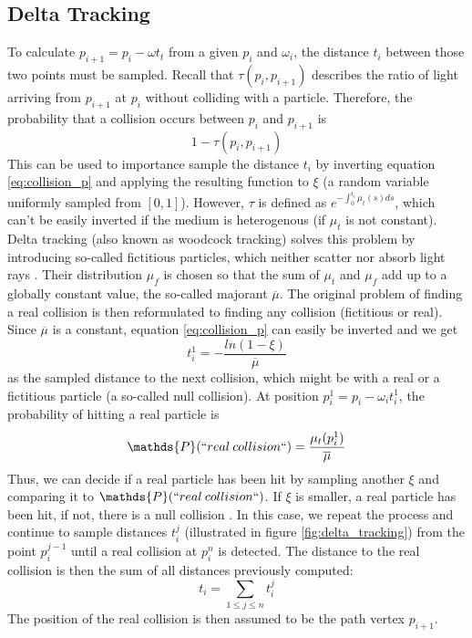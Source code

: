 \subsection{Delta Tracking}
To calculate $p_{i+1} = p_i - \omega t_t$ from a given $p_i$ and $\omega_i$, the distance $t_i$ between those two points must be sampled. Recall that $\tau(p_i, p_{i+1})$ describes the ratio of light arriving from $p_{i+1}$ at $p_i$ without colliding with a particle. Therefore, the probability that a collision occurs between $p_i$ and $p_{i+1}$ is 
\begin{equation} \label{eq:collision_p}
1 - \tau({p_i, p_{i+1}})
\end{equation}
This can be used to importance sample \cite{osti_4167844} the distance $t_i$ by inverting equation \ref{eq:collision_p} and applying the resulting function to $\xi$ (a random variable uniformly sampled from $[0,1]$). However, $\tau$ is defined as $e^{-\int_{0}^{t_i}\mu_t(s)ds}$, which can't be easily inverted if the medium is heterogenous (if $\mu_t$ is not constant).
Delta tracking (also known as woodcock tracking) solves this problem by introducing so-called fictitious particles, which neither scatter nor absorb light rays \cite{10.1145/2661229.2661292}. Their distribution $\mu_f$ is chosen so that the sum of $\mu_t$ and $\mu_f$ add up to a globally constant value, the so-called majorant $\overline{\mu}$.
The original problem of finding a real collision is then reformulated to finding any collision (fictitious or real).
Since $\overline{\mu}$ is a constant, equation \ref{eq:collision_p} can easily be inverted and we get
\begin{equation}
t_i^1 = - \frac{ln(1 - \xi)}{\overline{\mu}}
\end{equation} 
as the sampled distance to the next collision, which might be with a real or a fictitious particle (a so-called null collision).
At position $p_i^1 = p_i - \omega_i t_i^1$, the probability of hitting a real particle is 
\begin{equation}
\mathds{P}(``real \:collision``) = \frac{\mu_t(p_i^1)}{\overline{\mu}}
\end{equation}
 Thus, we can decide if a real particle has been hit by sampling another $\xi$ and comparing it to $\mathds{P}(``real \:collision``)$. If $\xi$ is smaller, a real particle has been hit, if not, there is a null collision \cite{10.1145/2661229.2661292}.
In this case, we repeat the process and continue to sample distances $t_i^j$ (illustrated in figure \ref{fig:delta_tracking}) from the point $p_i ^{j-1}$ until a real collision at $p_i^n$ is detected. The distance to the real collision is then the sum of all distances previously computed:
\begin{equation}
t_i = \sum_{1 \le j \le n} t_i^j
\end{equation}
The position of the real collision is then assumed to be the path vertex $p_{i+1}$.


